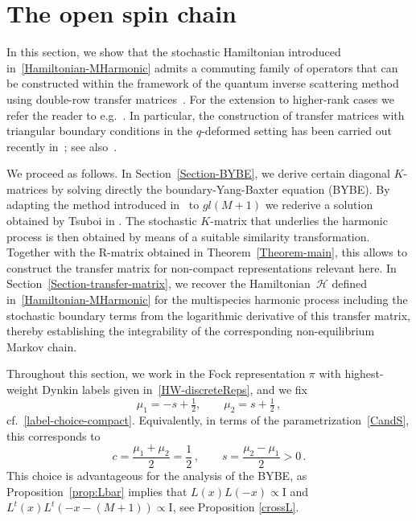 \documentclass[11pt]{article}
\numberwithin{equation}{section}
\newcommand{\M}{M}
\newcommand{\ID}{\mathrm{I}}
\newcommand{\eH}{\mathcal{H}}
\begin{document}
\section{The open spin chain}\label{sec:openchain}
In this section, we show that the stochastic Hamiltonian introduced in~\eqref{Hamiltonian-MHarmonic} admits a commuting family of operators that can be constructed within the framework of the quantum inverse scattering method using double-row transfer matrices~\cite{Sklyanin:1988yz}. For the extension to higher-rank cases we refer the reader to e.g.~\cite{Belliard:2010nhl}. In particular, the construction of transfer matrices with triangular boundary conditions in the $q$-deformed setting has been carried out recently in~\cite{2024JPhA...57x5201K}; see also~\cite{2019LMaPh.109.2049K}.

We proceed as follows. In Section~\ref{Section-BYBE}, we derive certain diagonal $K$-matrices by solving directly the boundary-Yang-Baxter equation (BYBE). By adapting the method introduced in~\cite{Frassek:2019vjt} to $gl(\M+1)$ we rederive a solution obtained by Tsuboi in \cite{Tsuboi:2018gfd}. The stochastic $K$-matrix that underlies the harmonic process is then obtained by means of a suitable similarity transformation. Together with the R-matrix obtained in Theorem~\ref{Theorem-main}, this allows to construct the transfer matrix for non-compact representations relevant here. In Section~\ref{Section-transfer-matrix}, we recover the Hamiltonian~$\eH$ defined in~\eqref{Hamiltonian-MHarmonic} for the multispecies harmonic process including the stochastic boundary terms from the logarithmic derivative of this transfer matrix, thereby establishing the integrability of the corresponding non-equilibrium Markov chain.
 
Throughout this section, we work in the Fock representation $\pi$ with highest-weight Dynkin labels given in~\eqref{HW-discreteReps}, and we fix
\begin{equation}\label{repsLabelFixing}
\mu_1 = -s + \tfrac{1}{2}, 
\qquad  
\mu_2 = s + \tfrac{1}{2}\,,
\end{equation}
cf.~\eqref{label-choice-compact}.
Equivalently, in terms of the parametrization~\eqref{CandS}, this corresponds to
\begin{equation}
    c = \frac{\mu_{1} + \mu_{2}}{2} = \frac{1}{2}\,,
    \qquad 
    s = \frac{\mu_{2} - \mu_{1}}{2} > 0\,.
\end{equation}
 This choice is advantageous for the analysis of the BYBE, as Proposition~\ref{prop:Lbar} implies that $L(x)L(-x) \propto \ID$ and  $L^t(x)L^t(-x-(M+1)) \propto \ID$, see Proposition \ref{crossL}. 
 
\end{document}
